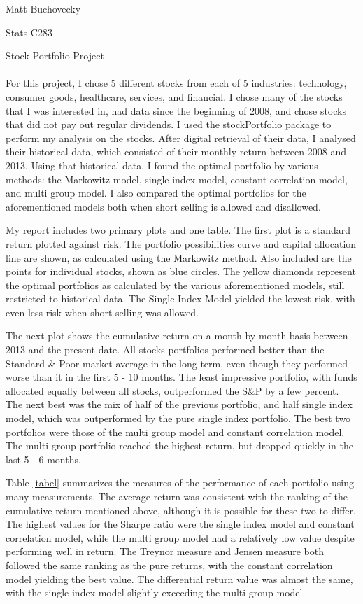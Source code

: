 \documentclass{article}
\begin{document}
\hfill Matt Buchovecky

\hfill Stats C283

\hfill Stock Portfolio Project \hfill 
\\ \\ 

For this project, I chose 5 different stocks from each of 5 industries: technology, consumer goods, healthcare, services, and financial. I chose many of the stocks that I was interested in, had data since the beginning of 2008, and chose stocks that did not pay out regular dividends. I used the stockPortfolio package to perform my analysis on the stocks. After digital retrieval of their data, I analysed their historical data, which consisted of their monthly return between 2008 and 2013. Using that historical data, I found the optimal portfolio by various methods: the Markowitz model, single index model, constant correlation model, and multi group model. I also compared the optimal portfolios for the aforementioned models both when short selling is allowed and disallowed. 

My report includes two primary plots and one table. 	The first plot is a standard return plotted against risk. The portfolio possibilities curve and capital allocation line are shown, as calculated using the Markowitz method. Also included are the points for individual stocks, shown as blue circles. The yellow diamonds represent the optimal portfolios as calculated by the various aforementioned models, still restricted to historical data. The Single Index Model yielded the lowest risk, with even less risk when short selling was allowed.  

The next plot shows the cumulative return on a month by month basis between 2013 and the present date. All stocks portfolios performed better than the Standard \& Poor market average in the long term, even though they performed worse than it in the first 5 - 10 months. The least impressive portfolio, with funds allocated equally between all stocks, outperformed the S\&P by a few percent. The next best was the mix of half of the previous portfolio, and half single index model, which was outperformed by the pure single index portfolio. The best two portfolios were those of the multi group model and constant correlation model. The multi group portfolio reached the highest return, but dropped quickly in the last 5 - 6 months. 

Table \ref{tabel} summarizes the measures of the performance of each portfolio using many measurements. The average return was consistent with the ranking of the cumulative return mentioned above, although it is possible for these two to differ. The highest values for the Sharpe ratio were the single index model and constant correlation model, while the multi group model had a relatively low value despite performing well in return. The Treynor measure and Jensen measure both followed the same ranking as the pure returns, with the constant correlation model yielding the best value. The differential return value was almost the same, with the single index model slightly exceeding the multi group model. 
\end{document}
